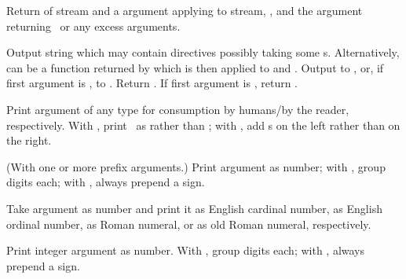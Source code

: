 \begin{LIST}{1cm}

  {
  Return  of stream and a  argument applying  to
  stream, , and the  argument
  returning \NIL\ or any excess arguments. 
  }

  {
  Output string  which may
  contain \kwd{\TLD} directives possibly taking some
  s. Alternatively,  can be a function returned
  by  which is then applied to  and .
  Output to ,  or, if first
  argument is \T, to . Return \retval{\NIL}. If
  first argument is \NIL, return . 
  }

  \begin{LIST}{.5cm}

    {%
      Print argument of any type for consumption by humans/by the
      reader, respectively. With \kwd{:}, print \NIL\ as \LIT{()} rather
      than ; with , add s on the left
      rather than on the right.
    }

    {%
      (With one or more prefix arguments.) Print argument as number; with
      \KWD{:}, group digits  each; with ,
      always prepend a sign. 
    }

    {
      Take argument as number and print it as English cardinal number,
      as English ordinal number, as Roman numeral, or as old Roman
      numeral, respectively.
    }

    {%
      Print integer argument as number. With \kwd{:}, group digits 
       each; with , always prepend a sign.
    }


\end{LIST}
\end{LIST}
